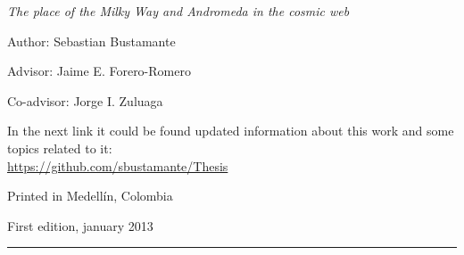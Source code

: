 
\thispagestyle{empty}

\hfill

\vfill

\medskip


\noindent
\textit{
The place of the Milky Way and Andromeda in the cosmic web
}




Author: Sebastian Bustamante

Advisor: Jaime E. Forero-Romero

Co-advisor: Jorge I. Zuluaga



\vfill

\vfill

\noindent
In the next link it could be found updated information about this work and 
some topics related to it: \\
\url{https://github.com/sbustamante/Thesis}


\noindent
Printed in Medellín, Colombia

\noindent
First edition, january 2013

\vspace{1cm}
\hrule
\bigskip

\cleardoublepage

%
%
%
%
%
%

